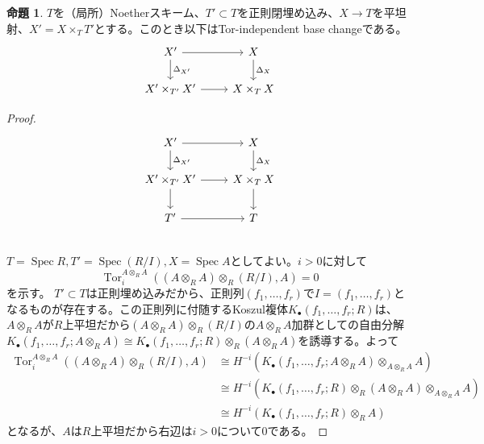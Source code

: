 \documentclass[uplatex, a4paper, dvipdfmx]{jsarticle}
\theoremstyle{definition}
\newtheorem{proposition}[theorem]{命題}
\DeclareMathOperator{\Tor}{\mathrm{Tor}}
\DeclareMathOperator{\Spec}{\mathrm{Spec}}
\begin{document}
\begin{proposition}
    $T$を（局所）Noetherスキーム、$T' \subset T$を正則閉埋め込み、$X \to T$を平坦射、$X' = X \times_T T'$とする。このとき以下はTor-independent base changeである。
    \[
        \begin{tikzcd}
            X' \ar[r]\ar[d, "\Delta_{X'}"] &X \ar[d, "\Delta_X"]\\
            X' \times_{T'} X' \ar[r] & X \times_T X
        \end{tikzcd}
    \]
\end{proposition}
\begin{proof}
    \[
        \begin{tikzcd}
            X' \ar[r]\ar[d, "\Delta_{X'}"] &X \ar[d, "\Delta_X"]\\
            X' \times_{T'} X' \ar[r] \ar[d] & X \times_T X \ar[d]\\
            T' \ar[r] & T\\
        \end{tikzcd}
    \]
    $T = \Spec R, T' = \Spec (R/I), X = \Spec A$としてよい。$i > 0$に対して
    \begin{equation}
        \Tor^{A \otimes_R A}_i((A \otimes_R A) \otimes_R (R/I), A) = 0
    \end{equation}
    を示す。
    $T' \subset T$は正則埋め込みだから、正則列$(f_1, \dots, f_r)$で$I = (f_1, \dots, f_r)$となるものが存在する。この正則列に付随するKoszul複体$K_{\bullet}(f_1, \dots, f_r; R)$は、$A \otimes_R A$が$R$上平坦だから$(A \otimes_R A) \otimes_R (R/I)$の$A \otimes_R A$加群としての自由分解$K_{\bullet}(f_1, \dots, f_r; A \otimes_R A) \cong K_{\bullet}(f_1, \dots, f_r; R) \otimes_R (A \otimes_R A)$を誘導する。よって
    \begin{align}
        \Tor^{A \otimes_R A}_i((A \otimes_R A) \otimes_R (R/I), A) & \cong H^{-i}(K_{\bullet}(f_1, \dots, f_r; A \otimes_R A) \otimes_{A \otimes_R A} A)               \\
                                                                   & \cong H^{-i}(K_{\bullet}(f_1, \dots, f_r; R) \otimes_R (A \otimes_R A) \otimes_{A \otimes_R A} A) \\
                                                                   & \cong H^{-i}(K_{\bullet}(f_1, \dots, f_r; R) \otimes_R A)
    \end{align}
    となるが、$A$は$R$上平坦だから右辺は$i > 0$について$0$である。
\end{proof}
\end{document}
